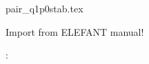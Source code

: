 \begin{flushright} {\tiny {\color{gray} pair\_q1p0stab.tex}} \end{flushright}

Import from ELEFANT manual!

\Literature: \cite{sike90,vibo92,kesi92,qizh07,lisi12,chco01,chri02}
